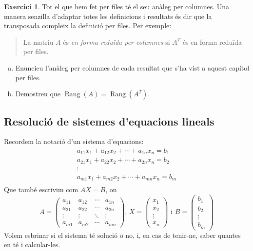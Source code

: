 \documentclass[a4paper,12pt,twoside]{article}
\newcommand{\1}{\mathbf{1}}
\newcommand{\0}{\mathbf{0}}
\DeclareMathOperator{\Rang}{Rang}
\theoremstyle{definition}
\newtheorem{exercici}{Exercici}[section]
\theoremstyle{remark}
\begin{document}
\begin{exercici}
	Tot el que hem fet per files té el seu anàleg per columnes. Una manera senzilla d'adaptar totes les definicions i resultats és dir que la transposada compleix la definició per files. Per exemple:
	\begin{quote}
		La matriu $A$ és \emph{en forma reduïda per columnes} si $A^T$ és en forma reduïda per files.
	\end{quote}
	\begin{enumerate}[(a)]
		\item Enuncieu l'anàleg per columnes de cada resultat que s'ha vist a aquest capítol per files.
		\item Demostreu que $\Rang(A)=\Rang(A^T)$.
	\end{enumerate}
\end{exercici}
\subsection{Resolució de sistemes d'equacions lineals}
Recordem la notació d'un sistema d'equacions:
	$$
\begin{matrix}
a_{11}x_1+a_{12}x_2+ \cdots + a_{1n}x_n = b_1 \\
a_{21}x_1+a_{22}x_2+ \cdots + a_{2n}x_n = b_2 \\
\vdots \\
a_{m1}x_1+a_{m2}x_2+ \cdots + a_{mn}x_n = b_m \\
\end{matrix}
$$
Que també escrivim com $AX=B$, on
$$A=
\left(\begin{array}{cccc}
a_{11} & a_{12} & \cdots & a_{1n} \\
a_{21} & a_{22} & \cdots & a_{2n} \\
\vdots & \vdots & \ddots & \vdots \\
a_{m1} & a_{m2} & \cdots & a_{mn} 
\end{array}\right)\text{, }
X=
\begin{pmatrix}
x_1 \\ x_2 \\ \vdots \\ x_n
\end{pmatrix} \text{ i }
B=
\begin{pmatrix}
b_1 \\ b_2 \\ \vdots \\ b_m
\end{pmatrix}
$$
Volem esbrinar si el sistema té solució o no, i, en cas de tenir-ne, saber quantes en té i calcular-les.
\end{document}
